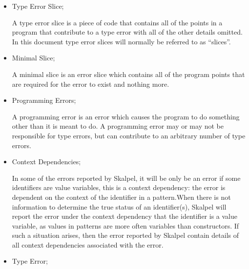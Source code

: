 \documentclass{report}
\begin{document}
\begin{itemize}


\item Type Error Slice;

  \subitem A type error slice is a piece of code that contains all of
  the points in a program that contribute to a type error with all of
  the other details omitted. In this document type error slices will
  normally be referred to as ``slices''.



\item Minimal Slice;

  \subitem A minimal slice is an error slice which contains all of the
  program points that are required for the error to exist and nothing
  more.



\item Programming Errors;

  \subitem A programming error is an error which causes the program to
  do something other than it is meant to do. A programming error may
  or may not be responsible for type errors, but can contribute to an
  arbitrary number of type errors.


\item Context Dependencies;

  \subitem In some of the errors reported by Skalpel, it
  will be only be an error if some identifiers are value variables,
  this is a context dependency: the error is dependent on the context
  of the identifier in a pattern.When there is not information to
  determine the true status of an identifier(s), Skalpel
  will report the error under the context dependency that the
  identifier is a value variable, as values in patterns are more often
  variables than constructors. If such a situation arises, then the
  error reported by Skalpel contain details of all
  context dependencies associated with the error.



\item Type Error;


\end{itemize}
\end{document}
